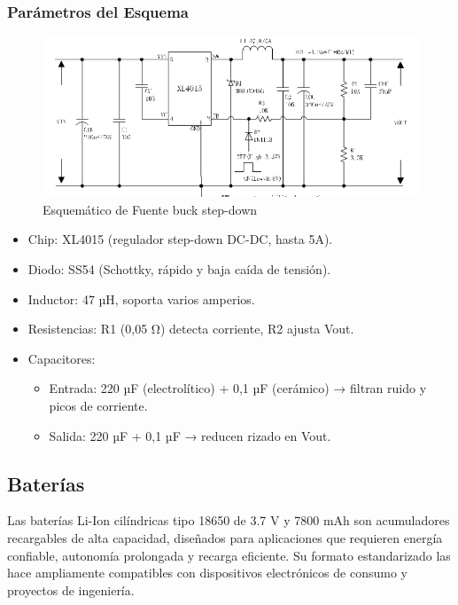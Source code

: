 \documentclass[12pt,a4paper]{article}
\begin{document}
\subsubsection{Parámetros del Esquema}

\begin{figure}
\includegraphics[width=0.9\linewidth]{Carpeta tecnica/esquemastepdown.png}
\caption{Esquemático de Fuente buck step-down}
\end{figure}

\begin{itemize}
\item Chip: XL4015 (regulador step-down DC-DC, hasta 5A).

\item Diodo: SS54 (Schottky, rápido y baja caída de tensión).

\item Inductor: 47 µH, soporta varios amperios.

\item Resistencias: R1 (0,05 Ω) detecta corriente, R2 ajusta Vout.

\item Capacitores:

\begin{itemize}


\item Entrada: 220 µF (electrolítico) + 0,1 µF (cerámico) → filtran ruido y picos de corriente.

\item Salida: 220 µF + 0,1 µF → reducen rizado en Vout.

\end{itemize}
\end{itemize}

\subsection{Baterías}

Las baterías Li-Ion cilíndricas tipo 18650 de 3.7 V y 7800 mAh son acumuladores recargables de alta capacidad, diseñados para aplicaciones que requieren energía confiable, autonomía prolongada y recarga eficiente. Su formato estandarizado las hace ampliamente compatibles con dispositivos electrónicos de consumo y proyectos de ingeniería.
\end{document}
